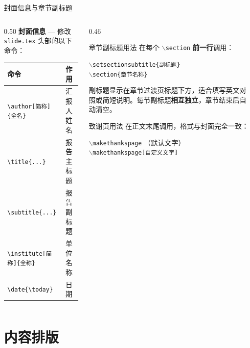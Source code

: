\documentclass[aspectratio=169]{beamer}
\def\cmd#1{\texttt{\color{red}\footnotesize $\backslash$#1}}
\begin{document}
\begin{frame}{封面信息与章节副标题}
\begin{columns}[T]
\begin{column}{0.50\textwidth}
\textbf{封面信息} — 修改 \texttt{slide.tex} 头部的以下命令：
\medskip
\begin{tabular}{ll}
\toprule
\textbf{命令} & \textbf{作用} \\
\midrule
\texttt{\textbackslash author[简称]\{全名\}} & 汇报人姓名 \\
\texttt{\textbackslash title\{...\}}         & 报告主标题 \\
\texttt{\textbackslash subtitle\{...\}}      & 报告副标题 \\
\texttt{\textbackslash institute[简称]\{全称\}} & 单位名称 \\
\texttt{\textbackslash date\{\textbackslash today\}} & 日期 \\
\bottomrule
\end{tabular}
\end{column}
\begin{column}{0.46\textwidth}
\begin{aim*}{章节副标题用法}{}
在每个 \cmd{section} \textbf{前一行}调用：
\smallskip

{\small\texttt{\cmd{setsectionsubtitle}\{副标题\}}}\\[0.2em]
{\small\texttt{\cmd{section}\{章节名称\}}}
\smallskip

副标题显示在章节过渡页标题下方，适合填写英文对照或简短说明。每节副标题\textbf{相互独立}，章节结束后自动清空。
\end{aim*}
\medskip
\begin{aim*}{致谢页用法}{}
在正文末尾调用，格式与封面完全一致：
\smallskip

{\small\texttt{\cmd{makethankspage}}} \quad（默认文字）\\[0.2em]
{\small\texttt{\cmd{makethankspage}[自定义文字]}}
\end{aim*}
\end{column}
\end{columns}
\end{frame}

\section{内容排版}
\end{document}
